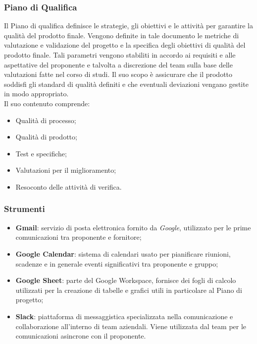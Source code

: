 \documentclass[10pt, a4paper]{article}
\begin{document}
\subsubsection{Piano di Qualifica}
Il Piano di qualifica definisce le strategie, gli obiettivi e le attività per garantire la qualità del prodotto finale. Vengono definite in 
tale documento le metriche di valutazione e validazione del progetto e la specifica degli obiettivi di qualità del prodotto finale. 
Tali parametri vengono stabiliti in accordo ai requisiti e alle aspettative del proponente e talvolta a discrezione del team sulla base 
delle valutazioni fatte nel corso di studi. Il suo scopo è assicurare che il prodotto soddisfi gli standard di qualità definiti e che 
eventuali deviazioni vengano gestite in modo appropriato.\\
Il suo contenuto comprende:
\begin{itemize}
    \item Qualità di processo;
    \item Qualità di prodotto;
    \item Test e specifiche;
    \item Valutazioni per il miglioramento;
    \item Resoconto delle attività di verifica.
\end{itemize}
\subsubsection{Strumenti}
\begin{itemize}
    \item {\textbf{Gmail}}: servizio di posta elettronica fornito da \textit{Google}, utilizzato per le prime comunicazioni tra proponente e fornitore;
    \item {\textbf{Google Calendar}}: sistema di calendari usato per pianificare riunioni, scadenze e in generale
    eventi significativi tra proponente e gruppo;
    \item {\textbf{Google Sheet}}: parte del Google Workspace, fornisce dei fogli di calcolo utilizzati per la creazione di tabelle e grafici utili in particolare al Piano di progetto;
    \item {\textbf{Slack}}: piattaforma di messaggistica specializzata nella comunicazione e collaborazione all'interno di team aziendali. Viene utilizzata dal team per le comunicazioni asincrone con il proponente.
\end{itemize}
\end{document}
